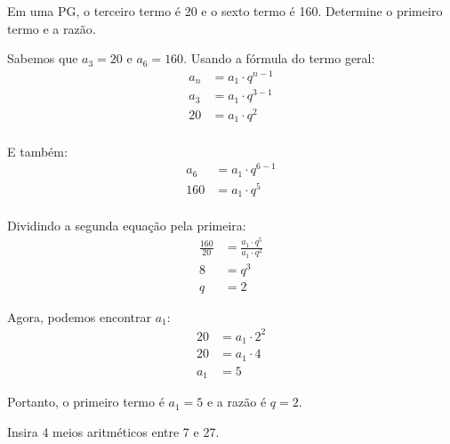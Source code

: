 \documentclass[12pt,a4paper]{article}
\begin{document}
\begin{tcolorbox}[colback=blue!5!white,colframe=blue!75!black,title=Exercício Adicional 6]
Em uma PG, o terceiro termo é 20 e o sexto termo é 160. Determine o primeiro termo e a razão.
\end{tcolorbox}

\begin{tcolorbox}[colback=green!5!white,colframe=green!75!black,title=Resolução]
Sabemos que $a_3 = 20$ e $a_6 = 160$. Usando a fórmula do termo geral:
\begin{align}
a_n &= a_1 \cdot q^{n-1}\\
a_3 &= a_1 \cdot q^{3-1}\\
20 &= a_1 \cdot q^2\\
\end{align}

E também:
\begin{align}
a_6 &= a_1 \cdot q^{6-1}\\
160 &= a_1 \cdot q^5\\
\end{align}

Dividindo a segunda equação pela primeira:
\begin{align}
\frac{160}{20} &= \frac{a_1 \cdot q^5}{a_1 \cdot q^2}\\
8 &= q^3\\
q &= 2
\end{align}

Agora, podemos encontrar $a_1$:
\begin{align}
20 &= a_1 \cdot 2^2\\
20 &= a_1 \cdot 4\\
a_1 &= 5
\end{align}

Portanto, o primeiro termo é $a_1 = 5$ e a razão é $q = 2$.
\end{tcolorbox}

\begin{tcolorbox}[colback=blue!5!white,colframe=blue!75!black,title=Exercício Adicional 7]
Insira 4 meios aritméticos entre 7 e 27.
\end{tcolorbox}
\end{document}
